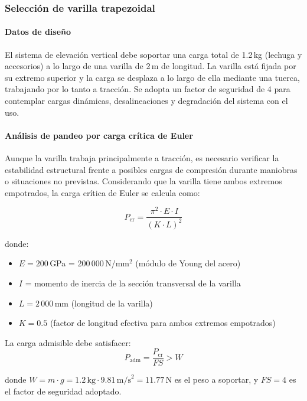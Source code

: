 \subsubsection{Selección de varilla trapezoidal} 
\label{sec:mov_vertical}
\paragraph{Datos de diseño}
El sistema de elevación vertical debe soportar una carga total de 1.2\,kg (lechuga y accesorios) a lo largo de una varilla de 2\,m de longitud. La varilla está fijada por su extremo superior y la carga se desplaza a lo largo de ella mediante una tuerca, trabajando por lo tanto a tracción. Se adopta un factor de seguridad de 4 para contemplar cargas dinámicas, desalineaciones y degradación del sistema con el uso.

\paragraph{Análisis de pandeo por carga crítica de Euler}
Aunque la varilla trabaja principalmente a tracción, es necesario verificar la estabilidad estructural frente a posibles cargas de compresión durante maniobras o situaciones no previstas. Considerando que la varilla tiene ambos extremos empotrados, la carga crítica de Euler se calcula como:

\begin{equation}
P_{\text{cr}} = \frac{\pi^2 \cdot E \cdot I}{(K \cdot L)^2}
\label{eq:euler_pandeo}
\end{equation}

donde:
\begin{itemize}
    \item $E = 200$\,GPa = 200\,000\,N/mm$^2$ (módulo de Young del acero)
    \item $I$ = momento de inercia de la sección transversal de la varilla
    \item $L = 2\,000$\,mm (longitud de la varilla)
    \item $K = 0.5$ (factor de longitud efectiva para ambos extremos empotrados)
\end{itemize}

La carga admisible debe satisfacer:
\begin{equation}
P_{\text{adm}} = \frac{P_{\text{cr}}}{FS} > W
\end{equation}

donde $W = m \cdot g = 1.2\,\text{kg} \cdot 9.81\,\text{m/s}^2 = 11.77$\,N es el peso a soportar, y $FS = 4$ es el factor de seguridad adoptado.

